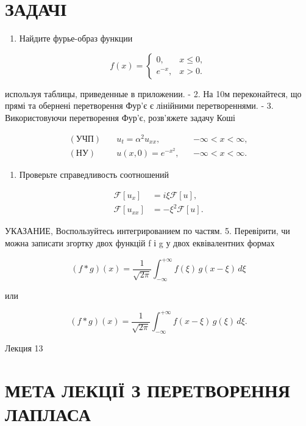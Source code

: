 \documentclass[
  ukrainian,
]{article}
\providecommand{\tightlist}{%
  \setlength{\itemsep}{0pt}\setlength{\parskip}{0pt}}
\begin{document}
\section{ЗАДАЧІ}\label{ux437ux430ux434ux430ux447ux456-1}

\begin{enumerate}
\def\labelenumi{\arabic{enumi}.}
\tightlist
\item
  Найдите фурье-образ функции
\end{enumerate}

\[
f(x)=
\begin{cases}
0, & x \le 0, \\
e^{-x}, & x > 0.
\end{cases}
\]

используя таблицы, приведенные в приложении. - 2. На 10м переконайтеся,
що прямі та обернені перетворення Фур'є є лінійними перетвореннями. - 3.
Використовуючи перетворення Фур'є, розв'яжете задачу Коші

\[
\begin{aligned}
(\text{УЧП})\quad & u_t = \alpha^2 u_{xx}, && -\infty < x < \infty,\\
(\text{НУ})\quad & u(x,0)=e^{-x^2}, && -\infty < x < \infty.
\end{aligned}
\]

\begin{enumerate}
\def\labelenumi{\arabic{enumi}.}
\setcounter{enumi}{3}
\tightlist
\item
  Проверьте справедливость соотношений
\end{enumerate}

\[
\begin{aligned}
\mathcal{F}\left[u_{x}\right] &= i\xi \mathcal{F}\left[u\right], \\
\mathcal{F}\left[u_{xx}\right] &= -\xi^{2} \mathcal{F}\left[u\right].
\end{aligned}
\]

УКАЗАНИЕ, Воспользуйтесь интегрированием по частям. 5. Перевірити, чи
можна записати згортку двох функцій f і g у двох еквівалентних формах

\[
(f * g)(x) = \frac{1}{\sqrt{2\pi}} \int_{-\infty}^{+\infty} f(\xi)\, g(x - \xi)\, d\xi
\]

или

\[
(f * g)(x) = \frac{1}{\sqrt{2\pi}} \int_{-\infty}^{+\infty} f(x-\xi)\, g(\xi)\, d\xi.
\]

Лекция 13

\section{МЕТА ЛЕКЦІЇ З ПЕРЕТВОРЕННЯ
ЛАПЛАСА}\label{ux43cux435ux442ux430-ux43bux435ux43aux446ux456ux457-ux437-ux43fux435ux440ux435ux442ux432ux43eux440ux435ux43dux43dux44f-ux43bux430ux43fux43bux430ux441ux430}
\end{document}
